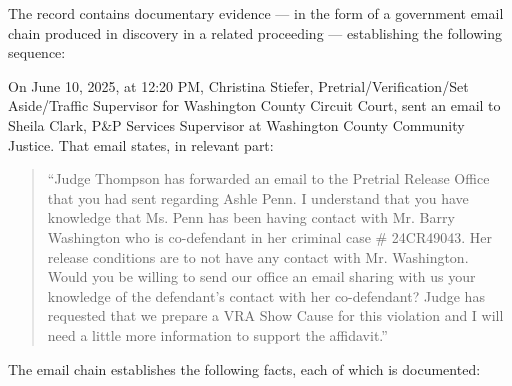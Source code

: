 \documentclass[12pt,letterpaper]{article}
\begin{document}
The record contains documentary evidence --- in the form of a government email
chain produced in discovery in a related proceeding --- establishing the following
sequence:

On June 10, 2025, at 12:20 PM, Christina Stiefer, Pretrial/Verification/Set
Aside/Traffic Supervisor for Washington County Circuit Court, sent an email to
Sheila Clark, P\&P Services Supervisor at Washington County Community Justice.
That email states, in relevant part:

\begin{quote}
``Judge Thompson has forwarded an email to the Pretrial Release Office that you
had sent regarding Ashle Penn. I understand that you have knowledge that Ms. Penn
has been having contact with Mr. Barry Washington who is co-defendant in her
criminal case \# 24CR49043. Her release conditions are to not have any contact
with Mr. Washington. Would you be willing to send our office an email sharing with
us your knowledge of the defendant's contact with her co-defendant? Judge has
requested that we prepare a VRA Show Cause for this violation and I will need a
little more information to support the affidavit.''
\end{quote}

The email chain establishes the following facts, each of which is documented:
\end{document}
